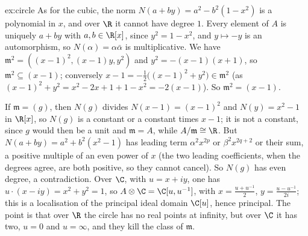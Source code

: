 \begin{solution}{ex:circle}
\idea As for the cubic, the norm $N(a+by)=a^2-b^2(1-x^2)$ is a polynomial in $x$, and over $\R$ it cannot have degree $1$.
\writeup Every element of $A$ is uniquely $a+by$ with $a,b\in\R[x]$, since $y^2=1-x^2$, and $y\mapsto-y$ is an automorphism, so $N(\alpha)=\alpha\bar\alpha$ is multiplicative. We have $\mathfrak m^2=((x-1)^2,(x-1)y,y^2)$
and $y^2=-(x-1)(x+1)$, so $\mathfrak m^2\subseteq(x-1)$; conversely $x-1=-\tfrac12\bigl((x-1)^2+y^2\bigr)\in\mathfrak m^2$ (as $(x-1)^2+y^2=x^2-2x+1+1-x^2=-2(x-1)$). So $\mathfrak m^2=(x-1)$.

If $\mathfrak m=(g)$, then $N(g)$ divides $N(x-1)=(x-1)^2$ and $N(y)=x^2-1$ in $\R[x]$, so $N(g)$ is a constant or a constant times $x-1$; it is not a constant, since $g$ would then be a unit and $\mathfrak m=A$, while
$A/\mathfrak m\cong\R$. But $N(a+by)=a^2+b^2(x^2-1)$ has leading term $\alpha^2x^{2p}$ or $\beta^2x^{2q+2}$ or their sum, a positive multiple of an even power of $x$ (the two leading coefficients, when the degrees agree, are both
positive, so they cannot cancel). So $N(g)$ has even degree, a contradiction. Over $\C$, with $u=x+iy$, one has $u\cdot(x-iy)=x^2+y^2=1$, so $A\otimes\C=\C[u,u^{-1}]$, with $x=\frac{u+u^{-1}}2$, $y=\frac{u-u^{-1}}{2i}$; this is a
localisation of the principal ideal domain $\C[u]$, hence principal. The point is that over $\R$ the circle has no real points at infinity, but over $\C$ it has two, $u=0$ and $u=\infty$, and they kill the class of $\mathfrak m$.
\end{solution}

